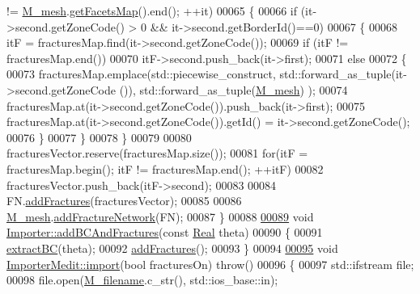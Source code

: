 \begin{DoxyCode}
      != \hyperlink{classFVCode3D_1_1Importer_a6f1542d6c6ac192e36c8eec7dc366653}{M\_mesh}.\hyperlink{classFVCode3D_1_1Mesh3D_a76de387da2a552e3e1210d795bc7acf9}{getFacetsMap}().end(); ++it)
00065     \{
00066         \textcolor{keywordflow}{if} (it->second.getZoneCode() > 0 && it->second.getBorderId()==0)
00067         \{
00068             itF = fracturesMap.find(it->second.getZoneCode());
00069             \textcolor{keywordflow}{if} (itF != fracturesMap.end())
00070                 itF->second.push\_back(it->first);
00071             \textcolor{keywordflow}{else}
00072             \{
00073                 fracturesMap.emplace(std::piecewise\_construct, std::forward\_as\_tuple(it->second.getZoneCode
      ()), std::forward\_as\_tuple(\hyperlink{classFVCode3D_1_1Importer_a6f1542d6c6ac192e36c8eec7dc366653}{M\_mesh}) );
00074                 fracturesMap.at(it->second.getZoneCode()).push\_back(it->first);
00075                 fracturesMap.at(it->second.getZoneCode()).getId() = it->second.getZoneCode();
00076             \}
00077         \}
00078     \}
00079 
00080     fracturesVector.reserve(fracturesMap.size());
00081     \textcolor{keywordflow}{for}(itF = fracturesMap.begin();  itF != fracturesMap.end(); ++itF)
00082         fracturesVector.push\_back(itF->second);
00083 
00084     FN.\hyperlink{classFVCode3D_1_1FractureNetwork3D_a1d1ae862d9076988686cef213dc0574d}{addFractures}(fracturesVector);
00085 
00086     \hyperlink{classFVCode3D_1_1Importer_a6f1542d6c6ac192e36c8eec7dc366653}{M\_mesh}.\hyperlink{classFVCode3D_1_1Mesh3D_a269c01796091da2f599e66b6b91b39dd}{addFractureNetwork}(FN);
00087 \}
00088 
\hypertarget{Import_8cpp_source.tex_l00089}{}\hyperlink{classFVCode3D_1_1Importer_ac21d82671c21b2e4069511ef0585d7f6}{00089} \textcolor{keywordtype}{void} \hyperlink{classFVCode3D_1_1Importer_ac21d82671c21b2e4069511ef0585d7f6}{Importer::addBCAndFractures}(\textcolor{keyword}{const} \hyperlink{namespaceFVCode3D_a40c1f5588a248569d80aa5f867080e83}{Real} theta)
00090 \{
00091     \hyperlink{classFVCode3D_1_1Importer_a1cba26ff3b2c475a51866361883c59fc}{extractBC}(theta);
00092     \hyperlink{classFVCode3D_1_1Importer_ac3c29fd7bbccef4ae39ce8d0b63b789f}{addFractures}();
00093 \}
00094 
\hypertarget{Import_8cpp_source.tex_l00095}{}\hyperlink{classFVCode3D_1_1ImporterMedit_a588447299960ebaf2f7583fe2ddecdcc}{00095} \textcolor{keywordtype}{void} \hyperlink{classFVCode3D_1_1ImporterMedit_a588447299960ebaf2f7583fe2ddecdcc}{ImporterMedit::import}(\textcolor{keywordtype}{bool} fracturesOn) \textcolor{keywordflow}{throw}()
00096 \{
00097     std::ifstream file;
00098     file.open(\hyperlink{classFVCode3D_1_1Importer_a318e689fb93c5c906f85aa13685724d7}{M\_filename}.c\_str(), std::ios\_base::in);

\end{DoxyCode}
